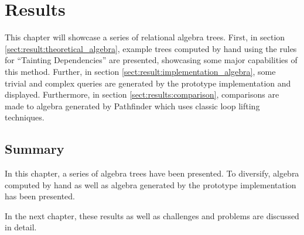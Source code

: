 \chapter{Results}
\label{chapter:results}
This chapter will showcase a series of relational algebra trees. First, in
section \ref{sect:result:theoretical_algebra}, example trees computed by hand
using the rules for ``Tainting Dependencies'' are presented, showcasing
some major capabilities of this method. Further, in section
\ref{sect:result:implementation_algebra}, some trivial and complex queries are
generated by the prototype implementation and displayed. Furthermore, in
section \ref{sect:results:comparison}, comparisons are made to algebra
generated by Pathfinder which uses classic loop lifting techniques.




\section{Summary}
\label{sect:res:summary}
In this chapter, a series of algebra trees have been presented. To diversify,
algebra computed by hand as well as algebra generated by the prototype
implementation has been presented. 

In the next chapter, these results as well as challenges and problems are
discussed in detail.
